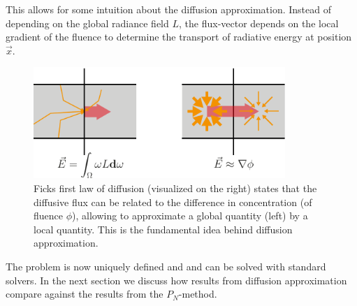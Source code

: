 This allows for some intuition about the diffusion approximation. Instead of depending on the global radiance field $L$, the flux-vector depends on the local gradient of the fluence to determine the transport of radiative energy at position $\vec{x}$.
\begin{figure}[h]
\centering
\includegraphics[width=0.85\textwidth]{05_diffusion_approximation/figures/fig_diffusion_idea.pdf}
\caption{Ficks first law of diffusion (visualized on the right) states that the diffusive flux can be related to the difference in concentration (of fluence $\phi$), allowing to approximate a global quantity (left) by a local quantity. This is the fundamental idea behind diffusion approximation.}
\label{fig:da_moment_problem_flux_as_fluence_gradient}
\end{figure}
The problem is now uniquely defined and and can be solved with standard solvers. In the next section we discuss how results from diffusion approximation compare against the results from the $P_N$-method.
